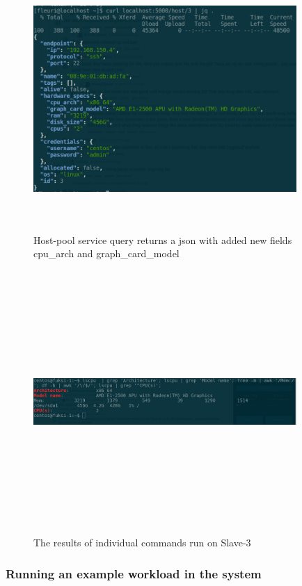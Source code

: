  \begin{figure}[ht!]
\centering
  \includegraphics[width=10cm,height=10cm, keepaspectratio]{masterqueryscreenshot.png}%
  \caption{Host-pool service query returns a json with added new fields cpu\_arch and graph\_card\_model}
  \label{fig:master_query}
\end{figure}

 \begin{figure}[ht!]
\centering
  \includegraphics[width=10cm,height=10cm, keepaspectratio]{slave_3_specs_screenshot.png}%
  \caption{The results of individual commands run on Slave-3}
  \label{fig:slave_3_specs}
\end{figure}

\subsubsection{Running an example workload in the system}

